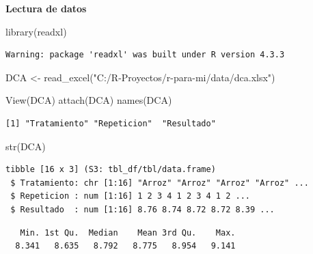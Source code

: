 \documentclass[
  spanish,
  letterpaper,
  DIV=11,
  numbers=noendperiod]{scrreprt}
\newenvironment{Shaded}{\begin{snugshade}}{\end{snugshade}}
\newcommand{\FunctionTok}[1]{\textcolor[rgb]{0.28,0.35,0.67}{#1}}
\newcommand{\NormalTok}[1]{\textcolor[rgb]{0.00,0.23,0.31}{#1}}
\newcommand{\OtherTok}[1]{\textcolor[rgb]{0.00,0.23,0.31}{#1}}
\newcommand{\SpecialCharTok}[1]{\textcolor[rgb]{0.37,0.37,0.37}{#1}}
\newcommand{\StringTok}[1]{\textcolor[rgb]{0.13,0.47,0.30}{#1}}
\begin{document}
\textbf{Lectura de datos}

\begin{Shaded}
\begin{Highlighting}[]
\FunctionTok{library}\NormalTok{(readxl)}
\end{Highlighting}
\end{Shaded}

\begin{verbatim}
Warning: package 'readxl' was built under R version 4.3.3
\end{verbatim}

\begin{Shaded}
\begin{Highlighting}[]
\NormalTok{DCA }\OtherTok{\textless{}{-}} \FunctionTok{read\_excel}\NormalTok{(}\StringTok{"C:/R{-}Proyectos/r{-}para{-}mi/data/dca.xlsx"}\NormalTok{)}

\FunctionTok{View}\NormalTok{(DCA)}
\FunctionTok{attach}\NormalTok{(DCA)}
\FunctionTok{names}\NormalTok{(DCA)}
\end{Highlighting}
\end{Shaded}

\begin{verbatim}
[1] "Tratamiento" "Repeticion"  "Resultado"  
\end{verbatim}

\begin{Shaded}
\begin{Highlighting}[]
\FunctionTok{str}\NormalTok{(DCA)}
\end{Highlighting}
\end{Shaded}

\begin{verbatim}
tibble [16 x 3] (S3: tbl_df/tbl/data.frame)
 $ Tratamiento: chr [1:16] "Arroz" "Arroz" "Arroz" "Arroz" ...
 $ Repeticion : num [1:16] 1 2 3 4 1 2 3 4 1 2 ...
 $ Resultado  : num [1:16] 8.76 8.74 8.72 8.72 8.39 ...
\end{verbatim}

\begin{Shaded}
\end{Shaded}

\begin{verbatim}
   Min. 1st Qu.  Median    Mean 3rd Qu.    Max. 
  8.341   8.635   8.792   8.775   8.954   9.141 
\end{verbatim}
\end{document}

